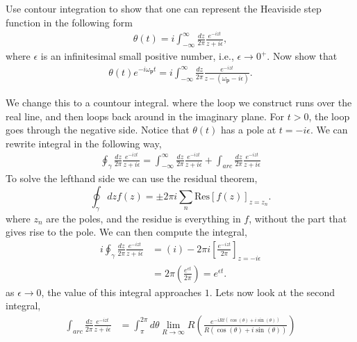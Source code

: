 \documentclass[working, oneside]{../../Preambles/tuftebook}
\begin{document}
\begin{exercise}[2]
Use contour integration to show that one can represent the Heaviside step function in the following form
\begin{align*}
\theta(t) = i \int_{-\infty}^\infty \frac{dz}{2\pi} \frac{e^{-izt}}{z + i\epsilon},
\end{align*}
where $\epsilon$ is an infinitesimal small positive number, i.e., $\epsilon \to 0^+$. Now show that
\begin{align*}
\theta(t) e^{-i \omega_\mathbf{p} t} = i \int_{-\infty}^\infty \frac{dz}{2\pi} \frac{e^{-izt}}{z - (\omega_\mathbf{p} - i\epsilon)}.
\end{align*}
\end{exercise}
\begin{solution}
We change this to a countour integral. where the loop we construct runs over the real line, and then loops back around in the imaginary plane. For $t>0$, the loop goes through the negative side. Notice that $\theta \left( t \right) $ has a pole at $t = -i\epsilon$. We can rewrite integral in the following way,
\begin{align*}
\oint_{\gamma} \frac{dz}{2\pi} \frac{e^{-izt}}{z + i\epsilon} =
\int_{-\infty}^{\infty} \frac{dz}{2\pi} \frac{e^{-izt}}{z + i\epsilon} +
\int_{arc} \frac{dz}{2\pi} \frac{e^{-izt}}{z + i\epsilon} 
\end{align*}
To solve the lefthand side we can use the residual theorem,
\[
\oint_{\gamma} dz f\left( z \right) = \pm 2\pi i \sum_n \text{Res}\left[ f\left( z \right)  \right] _{z = z_n}
.\] 
where $z_n$ are the poles, and the residue is everything in $f$, without the part that gives rise to the pole. We can then compute the integral,
\begin{align*}
    i\oint_{\gamma} \frac{dz}{2\pi} \frac{e^{-izt}}{z + i\epsilon} &= \left( i \right) -2\pi i \left[ \frac{e^{-izt}}{2\pi} \right]_{z = -i\epsilon} \\
    &= 2\pi \left( \frac{e^{\epsilon t}}{2\pi} \right) = e^{\epsilon t}
.\end{align*}
as $\epsilon \to 0$, the value of this integral approaches $1$. Lets now look at the second integral,
 \begin{align*}
     \int_{arc} \frac{dz}{2\pi} \frac{e^{-izt}}{z + i\epsilon} &= \int_{\pi}^{2\pi}d\theta \lim_{R \to \infty} R \left( \frac{e^{-iRt\left( \cos\left( \theta  \right) + i\sin\left( \theta  \right)  \right) }}{R\left( \cos\left( \theta  \right) + i\sin\left( \theta  \right)  \right) } \right) \\

\end{align*}
\end{solution}
\end{document}
